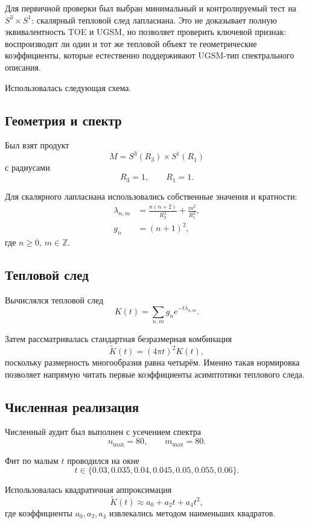 \documentclass[12pt,a4paper]{article}
\begin{document}
Для первичной проверки был выбран минимальный и контролируемый тест на \(S^3\times S^1\): скалярный тепловой след лапласиана. Это не доказывает полную эквивалентность TOE и UGSM, но позволяет проверить ключевой признак: воспроизводит ли один и тот же тепловой объект те геометрические коэффициенты, которые естественно поддерживают UGSM-тип спектрального описания.

Использовалась следующая схема.

\subsection{Геометрия и спектр}

Был взят продукт
\[
M=S^3(R_3)\times S^1(R_1)
\]
с радиусами
\[
R_3=1, \qquad R_1=1.
\]

Для скалярного лапласиана использовались собственные значения и кратности:
\begin{align}
\lambda_{n,m} &= \frac{n(n+2)}{R_3^2}+\frac{m^2}{R_1^2},\\
 g_n &= (n+1)^2,
\end{align}
где \(n\ge 0\), \(m\in\mathbb{Z}\).

\subsection{Тепловой след}

Вычислялся тепловой след
\begin{equation}
K(t)=\sum_{n,m} g_n e^{-t\lambda_{n,m}}.
\end{equation}

Затем рассматривалась стандартная безразмерная комбинация
\begin{equation}
\widetilde K(t)=(4\pi t)^2 K(t),
\end{equation}
поскольку размерность многообразия равна четырём. Именно такая нормировка позволяет напрямую читать первые коэффициенты асимптотики теплового следа.

\subsection{Численная реализация}

Численный аудит был выполнен с усечением спектра
\[
n_{\max}=80, \qquad m_{\max}=80.
\]

Фит по малым \(t\) проводился на окне
\[
t\in\{0.03,0.035,0.04,0.045,0.05,0.055,0.06\}.
\]

Использовалась квадратичная аппроксимация
\begin{equation}
\widetilde K(t)\approx a_0+a_2 t+a_4 t^2,
\end{equation}
где коэффициенты \(a_0,a_2,a_4\) извлекались методом наименьших квадратов.
\end{document}
